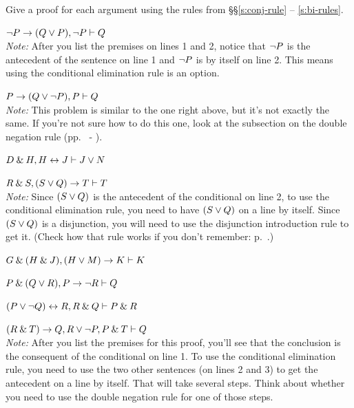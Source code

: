 \begin{small}

\problempart\label{practice-proofs-1}
Give a proof for each argument using the rules from \S\S \ref{s:conj-rule} -- \ref{s:bi-rules}.
\begin{earg}
\item ${\neg} P \rightarrow (Q \vee P), {\neg} P \vdash Q$\\
\textit{Note:} After you list the premises on lines 1 and 2, notice that ${\neg} P$ is the antecedent of the sentence on line 1 and ${\neg} P$ is by itself on line 2. This means using the conditional elimination rule is an option.
\medskip
\item $P \rightarrow (Q \vee {\neg} P), P \vdash Q$\\
\textit{Note:} This problem is similar to the one right above, but it's not exactly the same. If you're not sure how to do this one, look at the subsection on the double negation rule (pp.~\pageref{subsection-DN} - \pageref{DN-box}).
\medskip
\item $D \mathbin{\&} H, H \leftrightarrow J  \vdash J \vee N$\smallskip 

\item $R \mathbin{\&} S, (S \vee Q) \rightarrow T \vdash T$\\
\textit{Note:} Since $(S \vee Q)$ is the antecedent of the conditional on line 2, to use the conditional elimination rule, you need to have $(S \vee Q)$ on a line by itself. Since $(S \vee Q)$ is a disjunction, you will need to use the disjunction introduction rule to get it. (Check how that rule works if you don't remember: p.~\pageref{di-rule-box}.)
\medskip

\item $G \mathbin{\&} (H \mathbin{\&} J), (H \vee M) \rightarrow K \vdash K$\smallskip
\item $P \mathbin{\&} (Q \vee R), P \rightarrow {\neg} R \vdash Q$\smallskip
\item $(P \vee {\neg} Q) \leftrightarrow R, R \mathbin{\&} Q \vdash P \mathbin{\&} R$\smallskip
\item $(R \mathbin{\&} T) \rightarrow Q, R \vee {\neg} P, P \mathbin{\&} T \vdash Q$\\
\textit{Note:} After you list the premises for this proof, you'll see that the conclusion is the consequent of the conditional on line 1. To use the conditional elimination rule, you need to use the two other sentences (on lines 2 and 3) to get the antecedent on a line by itself. That will take several steps. Think about whether you need to use the double negation rule for one of those steps. 
\medskip


\end{earg}
\end{small}
